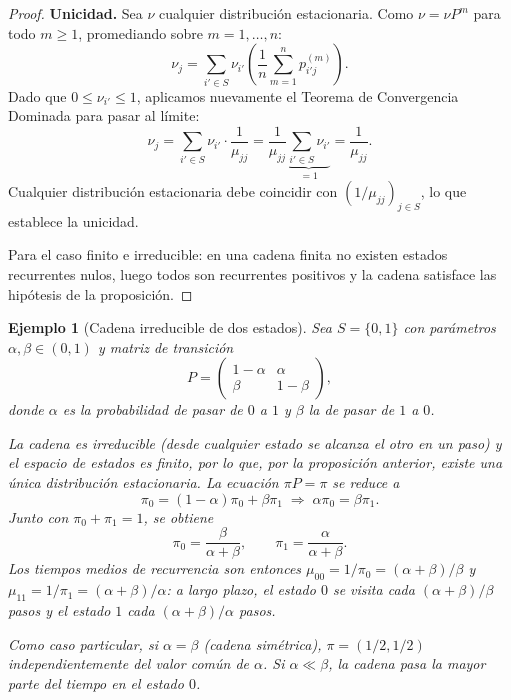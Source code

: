 \documentclass[12pt]{book}
\newtheorem{example}{Ejemplo}[chapter]
\begin{document}
\begin{proof}
    \medskip
    \textbf{Unicidad.}
    Sea $\nu$ cualquier distribución estacionaria. Como $\nu = \nu P^m$ para todo $m \ge 1$, promediando sobre $m = 1, \dots, n$:
    \[
        \nu_j = \sum_{i' \in S} \nu_{i'} \left(\frac{1}{n}\sum_{m=1}^n p_{i'j}^{(m)}\right).
    \]
    Dado que $0 \le \nu_{i'} \le 1$, aplicamos nuevamente el Teorema de Convergencia Dominada para pasar al límite:
    \[
        \nu_j = \sum_{i' \in S} \nu_{i'} \cdot \frac{1}{\mu_{jj}}
              = \frac{1}{\mu_{jj}}\underbrace{\sum_{i' \in S} \nu_{i'}}_{=1} = \frac{1}{\mu_{jj}}.
    \]
    Cualquier distribución estacionaria debe coincidir con $(1/\mu_{jj})_{j \in S}$, lo que establece la unicidad.

    \medskip
    Para el caso finito e irreducible: en una cadena finita no existen estados recurrentes nulos, luego todos son recurrentes positivos y la cadena satisface las hipótesis de la proposición.
\end{proof}

\begin{example}[Cadena irreducible de dos estados]
    Sea $S = \{0, 1\}$ con parámetros $\alpha, \beta \in (0,1)$ y matriz de transición
    \[
        P = \begin{pmatrix} 1-\alpha & \alpha \\ \beta & 1-\beta \end{pmatrix},
    \]
    donde $\alpha$ es la probabilidad de pasar de $0$ a $1$ y $\beta$ la de pasar de $1$ a $0$.

    \medskip
    La cadena es irreducible (desde cualquier estado se alcanza el otro en un paso) y el espacio de estados es finito, por lo que, por la proposición anterior, existe una única distribución estacionaria. La ecuación $\pi P = \pi$ se reduce a
    \[
        \pi_0 = (1-\alpha)\pi_0 + \beta\pi_1 \;\Longrightarrow\; \alpha\pi_0 = \beta\pi_1.
    \]
    Junto con $\pi_0 + \pi_1 = 1$, se obtiene
    \[
        \pi_0 = \frac{\beta}{\alpha+\beta}, \qquad \pi_1 = \frac{\alpha}{\alpha+\beta}.
    \]
    Los tiempos medios de recurrencia son entonces $\mu_{00} = 1/\pi_0 = (\alpha+\beta)/\beta$ y $\mu_{11} = 1/\pi_1 = (\alpha+\beta)/\alpha$: a largo plazo, el estado $0$ se visita cada $(\alpha+\beta)/\beta$ pasos y el estado $1$ cada $(\alpha+\beta)/\alpha$ pasos.

    \medskip
    Como caso particular, si $\alpha = \beta$ (cadena simétrica), $\pi = (1/2, 1/2)$ independientemente del valor común de $\alpha$. Si $\alpha \ll \beta$, la cadena pasa la mayor parte del tiempo en el estado $0$.
\end{example}
\end{document}
